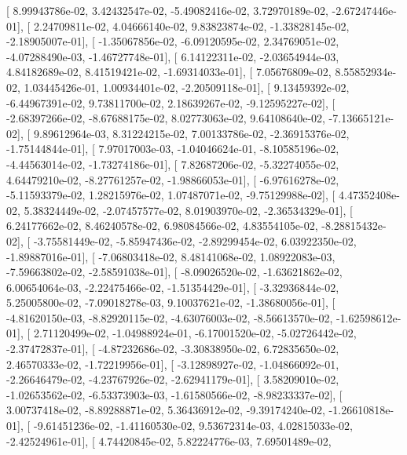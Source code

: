 \documentclass{article}
\begin{document}
       [  8.99943786e-02,   3.42432547e-02,  -5.49082416e-02,
          3.72970189e-02,  -2.67247446e-01],
       [  2.24709811e-02,   4.04666140e-02,   9.83823874e-02,
         -1.33828145e-02,  -2.18905007e-01],
       [ -1.35067856e-02,  -6.09120595e-02,   2.34769051e-02,
         -4.07288490e-03,  -1.46727748e-01],
       [  6.14122311e-02,  -2.03654944e-03,   4.84182689e-02,
          8.41519421e-02,  -1.69314033e-01],
       [  7.05676809e-02,   8.55852934e-02,   1.03445426e-01,
          1.00934401e-02,  -2.20509118e-01],
       [  9.13459392e-02,  -6.44967391e-02,   9.73811700e-02,
          2.18639267e-02,  -9.12595227e-02],
       [ -2.68397266e-02,  -8.67688175e-02,   8.02773063e-02,
          9.64108640e-02,  -7.13665121e-02],
       [  9.89612964e-03,   8.31224215e-02,   7.00133786e-02,
         -2.36915376e-02,  -1.75144844e-01],
       [  7.97017003e-03,  -1.04046624e-01,  -8.10585196e-02,
         -4.44563014e-02,  -1.73274186e-01],
       [  7.82687206e-02,  -5.32274055e-02,   4.64479210e-02,
         -8.27761257e-02,  -1.98866053e-01],
       [ -6.97616278e-02,  -5.11593379e-02,   1.28215976e-02,
          1.07487071e-02,  -9.75129988e-02],
       [  4.47352408e-02,   5.38324449e-02,  -2.07457577e-02,
          8.01903970e-02,  -2.36534329e-01],
       [  6.24177662e-02,   8.46240578e-02,   6.98084566e-02,
          4.83554105e-02,  -8.28815432e-02],
       [ -3.75581449e-02,  -5.85947436e-02,  -2.89299454e-02,
          6.03922350e-02,  -1.89887016e-01],
       [ -7.06803418e-02,   8.48141068e-02,   1.08922083e-03,
         -7.59663802e-02,  -2.58591038e-01],
       [ -8.09026520e-02,  -1.63621862e-02,   6.00654064e-03,
         -2.22475466e-02,  -1.51354429e-01],
       [ -3.32936844e-02,   5.25005800e-02,  -7.09018278e-03,
          9.10037621e-02,  -1.38680056e-01],
       [ -4.81620150e-03,  -8.82920115e-02,  -4.63076003e-02,
         -8.56613570e-02,  -1.62598612e-01],
       [  2.71120499e-02,  -1.04988924e-01,  -6.17001520e-02,
         -5.02726442e-02,  -2.37472837e-01],
       [ -4.87232686e-02,  -3.30838950e-02,   6.72835650e-02,
          2.46570333e-02,  -1.72219956e-01],
       [ -3.12898927e-02,  -1.04866092e-01,  -2.26646479e-02,
         -4.23767926e-02,  -2.62941179e-01],
       [  3.58209010e-02,  -1.02653562e-02,  -6.53373903e-03,
         -1.61580566e-02,  -8.98233337e-02],
       [  3.00737418e-02,  -8.89288871e-02,   5.36436912e-02,
         -9.39174240e-02,  -1.26610818e-01],
       [ -9.61451236e-02,  -1.41160530e-02,   9.53672314e-03,
          4.02815033e-02,  -2.42524961e-01],
       [  4.74420845e-02,   5.82224776e-03,   7.69501489e-02,
\end{document}
